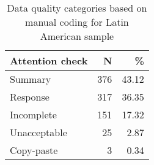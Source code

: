 \begin{table}

\caption{Data quality categories based on manual coding for Latin American sample}
\centering
\begin{tabular}[t]{lrr}
\toprule
Attention check & N & \%\\
\midrule
Summary & 376 & 43.12\\
Response & 317 & 36.35\\
Incomplete & 151 & 17.32\\
Unacceptable & 25 & 2.87\\
Copy-paste & 3 & 0.34\\
\bottomrule
\end{tabular}
\end{table}

